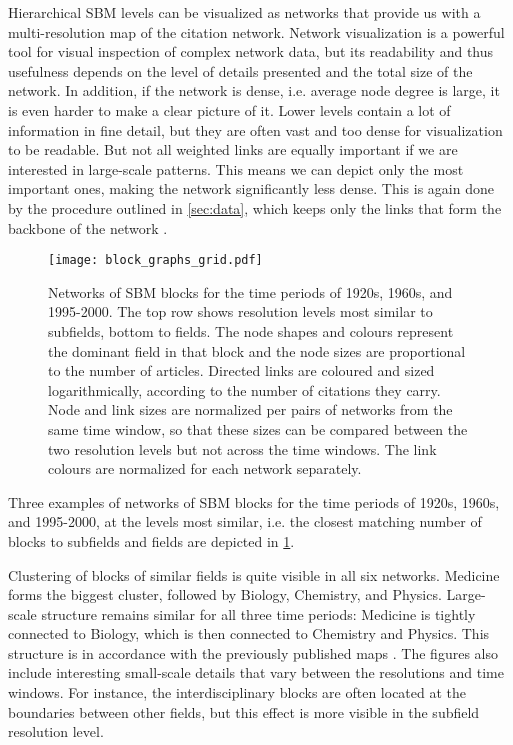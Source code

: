 \documentclass[a4paper,12pt]{article}
\begin{document}
Hierarchical SBM levels can be visualized as networks that provide us with a multi-resolution map of the citation network. Network visualization is a powerful tool for visual inspection of complex network data, 
but its readability and thus usefulness depends on the level of details presented and 
the total size of the network. In addition, if the network is dense, i.e. average node degree 
is large, it is even harder to make a clear picture of it. 
Lower levels contain a lot of information in fine detail, but they are often 
vast and too dense for visualization to be readable. But not all weighted links are 
equally important if we are interested in large-scale patterns. This means we can depict 
only the most important ones, making the network significantly less dense. This is again 
done by the procedure outlined in \cref{sec:data}, 
which keeps only the links that form the backbone of the network \citep{Serrano2009}.

\begin{figure}
  \centering
  \texttt{[image: block\_graphs\_grid.pdf]}
  \caption{Networks of SBM blocks for the time periods of 1920s, 1960s, and 1995-2000. The top row 
shows resolution levels most similar to subfields, bottom to fields.
The node shapes and colours represent the dominant field in that block and 
the node sizes are proportional to the number of articles.
Directed links are coloured and sized logarithmically, according to the number of citations they carry.
Node and link sizes are normalized per pairs of networks from the same time window, so that these sizes
can be compared between the two resolution levels but not across the time windows.
The link colours are normalized for each network separately.
}
  \label{fig:networks}
\end{figure}

Three examples of networks of SBM blocks for the time periods of 1920s, 
1960s, and 1995-2000, at the levels most similar, i.e. the closest matching number of blocks to 
subfields and fields are depicted in \cref{fig:networks}.

Clustering of blocks of similar fields is quite visible in all six networks. Medicine 
forms the biggest cluster, followed by Biology, Chemistry, and Physics. Large-scale 
structure remains similar for all three time periods: Medicine is tightly 
connected to Biology, which is then connected to Chemistry and Physics.
This structure is in accordance with the previously published maps \citep{Rosvall2008,Leydesdorff2009}.
The figures also include interesting small-scale details that vary between the resolutions and time windows.
For instance, the interdisciplinary blocks are often located at the boundaries between other fields, but this effect is more visible in the subfield resolution level.
\end{document}
